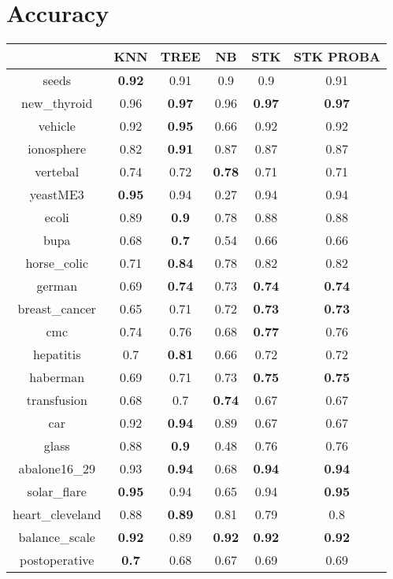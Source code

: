 \documentclass{article}%
\begin{document}
%
\normalsize%
\section*{Accuracy}%
\begin{tabular}{c|ccccc}%
&KNN&TREE&NB&STK&STK PROBA\\%
\hline%
seeds&\textbf{0.92}&0.91&0.9&0.9&0.91\\%
new\_thyroid&0.96&\textbf{0.97}&0.96&\textbf{0.97}&\textbf{0.97}\\%
vehicle&0.92&\textbf{0.95}&0.66&0.92&0.92\\%
ionosphere&0.82&\textbf{0.91}&0.87&0.87&0.87\\%
vertebal&0.74&0.72&\textbf{0.78}&0.71&0.71\\%
yeastME3&\textbf{0.95}&0.94&0.27&0.94&0.94\\%
ecoli&0.89&\textbf{0.9}&0.78&0.88&0.88\\%
bupa&0.68&\textbf{0.7}&0.54&0.66&0.66\\%
horse\_colic&0.71&\textbf{0.84}&0.78&0.82&0.82\\%
german&0.69&\textbf{0.74}&0.73&\textbf{0.74}&\textbf{0.74}\\%
breast\_cancer&0.65&0.71&0.72&\textbf{0.73}&\textbf{0.73}\\%
cmc&0.74&0.76&0.68&\textbf{0.77}&0.76\\%
hepatitis&0.7&\textbf{0.81}&0.66&0.72&0.72\\%
haberman&0.69&0.71&0.73&\textbf{0.75}&\textbf{0.75}\\%
transfusion&0.68&0.7&\textbf{0.74}&0.67&0.67\\%
car&0.92&\textbf{0.94}&0.89&0.67&0.67\\%
glass&0.88&\textbf{0.9}&0.48&0.76&0.76\\%
abalone16\_29&0.93&\textbf{0.94}&0.68&\textbf{0.94}&\textbf{0.94}\\%
solar\_flare&\textbf{0.95}&0.94&0.65&0.94&\textbf{0.95}\\%
heart\_cleveland&0.88&\textbf{0.89}&0.81&0.79&0.8\\%
balance\_scale&\textbf{0.92}&0.89&\textbf{0.92}&\textbf{0.92}&\textbf{0.92}\\%
postoperative&\textbf{0.7}&0.68&0.67&0.69&0.69\\%
\end{tabular}

%
\end{document}
